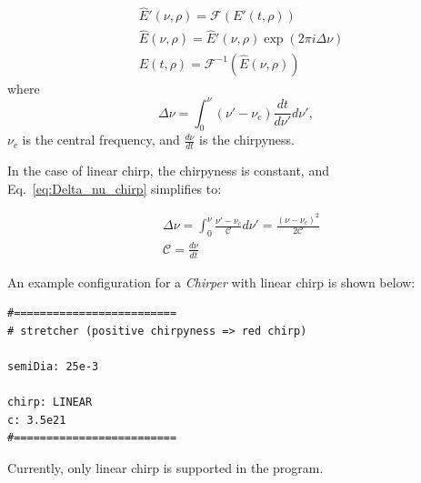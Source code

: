 \begin{equation}
\begin{aligned}
&\widehat{E}'(\nu,\rho) = \mathcal{F}(E'(t,\rho))\\
&\widehat{E}(\nu,\rho) = \widehat{E}'(\nu,\rho) \exp(2 \pi i \Delta\nu)\\
&E(t,\rho) = \mathcal{F}^{-1}(\widehat{E}(\nu,\rho))
\end{aligned}
\end{equation}
where 
\begin{equation}\label{eq:Delta_nu_chirp}
 \Delta \nu = \int_0^{\nu} (\nu'-\nu_c) \frac{dt}{d\nu'} d\nu',
\end{equation}
\(\nu_c\) is the central frequency, and \(\frac{d\nu}{dt}\) is the chirpyness.

In the case of linear chirp, the chirpyness is constant, and Eq.~\ref{eq:Delta_nu_chirp} simplifies to:

\begin{equation}
\begin{aligned}
&\Delta \nu = \int_0^{\nu} \frac{\nu'-\nu_c}{\mathcal{C}} d\nu' = \frac{(\nu-\nu_c)^2}{2\mathcal{C}}\\
&\mathcal{C} = \frac{d\nu}{dt}
\end{aligned}
\end{equation}

An example configuration for a \textit{Chirper} with linear chirp is shown below:

\begin{verbatim}
#=========================
# stretcher (positive chirpyness => red chirp)

semiDia: 25e-3

chirp: LINEAR
c: 3.5e21
#=========================
\end{verbatim}

Currently, only linear chirp is supported in the program.

